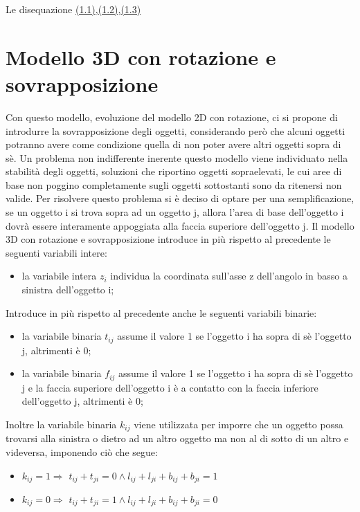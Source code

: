 Le disequazione \hyperlink{(1.1)}{(1.1)},\hyperlink{(1.2)}{(1.2)},\hyperlink{(1.3)}{(1.3)}  

\section{Modello 3D con rotazione e sovrapposizione}
Con questo modello, evoluzione del modello 2D con rotazione, ci si propone di introdurre la sovrapposizione degli oggetti, considerando però che alcuni oggetti potranno avere come condizione quella di non poter avere altri oggetti sopra di sè. Un problema non indifferente inerente questo modello viene individuato nella stabilità degli oggetti, soluzioni che riportino oggetti sopraelevati, le cui aree di base non poggino completamente sugli oggetti sottostanti sono da ritenersi non valide. Per risolvere questo problema si è deciso di optare per una semplificazione, se un oggetto i si trova sopra ad un oggetto j, allora l'area di base dell'oggetto i dovrà essere interamente appoggiata alla faccia superiore dell'oggetto j.
Il modello 3D con rotazione e sovrapposizione introduce in più rispetto al precedente le seguenti variabili intere:
\begin{itemize}
\item la variabile intera $z_{i}$ individua la coordinata sull'asse z dell'angolo in basso a sinistra dell'oggetto i;
\end{itemize}
Introduce in più rispetto al precedente anche le seguenti variabili binarie:
\begin{itemize}
    \item la variabile binaria $t_{ij}$ assume il valore 1 se l'oggetto i ha sopra di sè l'oggetto j, altrimenti è 0;
    \item la variabile binaria $f_{ij}$ assume il valore 1 se l'oggetto i ha sopra di sè l'oggetto j e la faccia superiore dell'oggetto i è a contatto con la faccia inferiore dell'oggetto j, altrimenti è 0;
\end{itemize}
Inoltre la variabile binaria $k_{ij}$ viene utilizzata per imporre che un oggetto possa trovarsi alla sinistra o dietro ad un altro oggetto ma non al di sotto di un altro e videversa, imponendo ciò che segue:
\begin{itemize}
    \item \textbf{$k_{ij} = 1 \Rightarrow$} $t_{ij} + t_{ji} = 0 \land l_{ij} + l_{ji} + b_{ij} + b_{ji} = 1$
    \item \textbf{$k_{ij} = 0 \Rightarrow$} $t_{ij} + t_{ji} = 1 \land l_{ij} + l_{ji} + b_{ij} + b_{ji}= 0$
\end{itemize}

